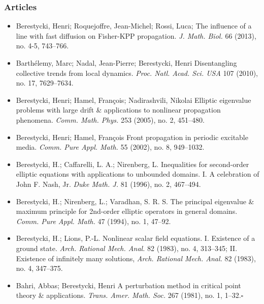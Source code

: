 \documentclass{article}
\begin{document}
\subsubsection{Articles}
\begin{itemize}
	\item Berestycki, Henri; Roquejoffre, Jean-Michel; Rossi, Luca; The influence of a line with fast diffusion on Fisher-KPP propagation. \textit{J. Math. Biol.} 66 (2013), no. 4-5, 743--766.
	\item Barthélemy, Marc; Nadal, Jean-Pierre; Berestycki, Henri Disentangling collective trends from local dynamics. \textit{Proc. Natl. Acad. Sci. USA} 107 (2010), no. 17, 7629--7634.
	\item Berestycki, Henri; Hamel, François; Nadirashvili, Nikolai Elliptic eigenvalue problems with large drift \& applications to nonlinear propagation phenomena. \textit{Comm. Math. Phys.} 253 (2005), no. 2, 451--480.
	\item Berestycki, Henri; Hamel, François Front propagation in periodic excitable media. \textit{Comm. Pure Appl. Math.} 55 (2002), no. 8, 949--1032.
	\item Berestycki, H.; Caffarelli, L. A.; Nirenberg, L. Inequalities for second-order elliptic equations with applications to unbounded domains. I. A celebration of John F. Nash, Jr. \textit{Duke Math. J.} 81 (1996), no. 2, 467--494.
	\item Berestycki, H.; Nirenberg, L.; Varadhan, S. R. S. The principal eigenvalue \& maximum principle for 2nd-order elliptic operators in general domains. \textit{Comm. Pure Appl. Math.} 47 (1994), no. 1, 47--92.
	\item Berestycki, H.; Lions, P.-L. Nonlinear scalar field equations. I. Existence of a ground state. \textit{Arch. Rational Mech. Anal.} 82 (1983), no. 4, 313--345; II. Existence of infinitely many solutions, \textit{Arch. Rational Mech. Anal.} 82 (1983), no. 4, 347--375.
	\item Bahri, Abbas; Berestycki, Henri A perturbation method in critical point theory \& applications. \textit{Trans. Amer. Math. Soc.} 267 (1981), no. 1, 1--32.\hfill$\square$
\end{itemize}

\end{document}
